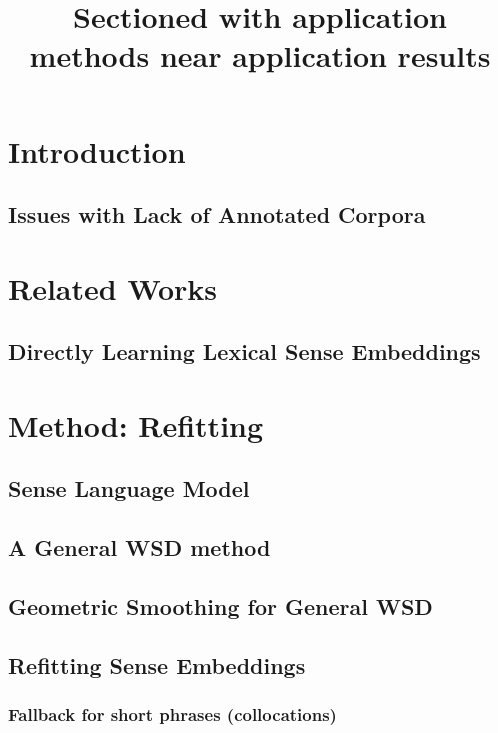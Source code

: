 \documentclass{sig-alternate}
\begin{document}
	
	\title{Sectioned with application methods near application results}
	\maketitle
	
	\begin{abstract}
	\end{abstract}
	
	\section{Introduction}
	\subsection{Issues with Lack of Annotated Corpora} \label{corpussize}
	\section{Related Works} \label{relatedwords}
		\subsection{Directly Learning Lexical Sense Embeddings}
	
	\section{Method: Refitting} \label{Frameword}
	\subsection{Sense Language Model} \label{senselanguagemodel}
	\subsection{A General WSD method} \label{generalwsd}
	\subsection{Geometric Smoothing for General WSD}
	\subsection{Refitting Sense Embeddings}
		\subsubsection {Fallback for short phrases (collocations)}
	
\end{document}
